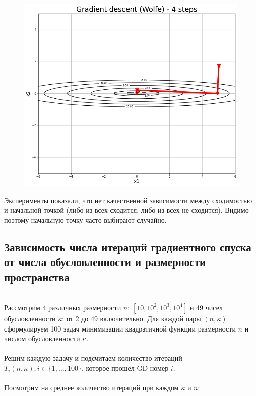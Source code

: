 \documentclass[14pt]{article}
\begin{document}
\begin{figure}[h]
	\includegraphics[height=0.4\paperheight]{deform_wolfe.png}
\end{figure}

Эксперименты показали, что нет качественной зависимости между сходимостью и начальной точкой (либо из всех сходится, либо из всех не сходится). Видимо поэтому начальную точку часто выбирают случайно.

\newpage

\subsection{Зависимость числа итераций градиентного спуска от числа обусловленности и размерности пространства
}

\\

Рассмотрим 4 различных размерности $n$: $[10, 10^2, 10^3, 10^4]$ и 49 чисел обусловленности $\kappa$: от 2 до 49 включительно. Для каждой пары $(n, \kappa)$ сформулируем 100 задач минимизации квадратичной функции размерности $n$ и числом обусловленности $\kappa$.  
\\ \\ Решим каждую задачу и подсчитаем количество итераций $T_i(n, \kappa), i \in \{1, \dots, 100\} $, которое прошел GD номер $i$. \\ \\
Посмотрим на среднее количество итераций при каждом $\kappa$ и $n$:
\end{document}
